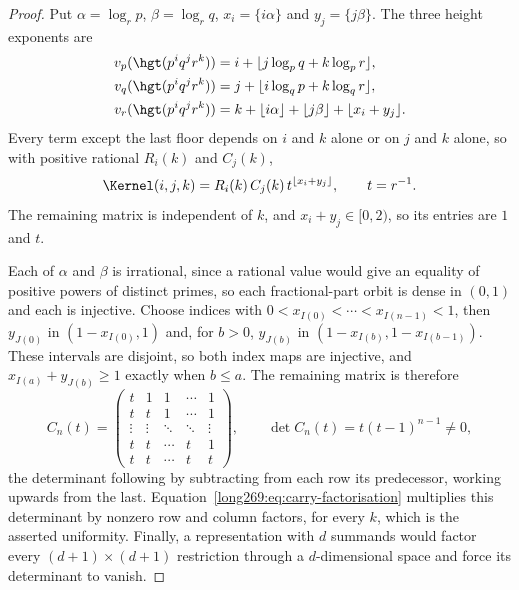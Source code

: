 \begin{proof}
Put $\alpha=\log_r p$, $\beta=\log_r q$, $x_i=\{i\alpha\}$ and
$y_j=\{j\beta\}$.  The three height exponents are
\[
 \begin{split}
 v_p(\hgt(p^iq^jr^k))&=i+\lfloor j\log_pq+k\log_pr\rfloor,\\
 v_q(\hgt(p^iq^jr^k))&=j+\lfloor i\log_qp+k\log_qr\rfloor,\\
 v_r(\hgt(p^iq^jr^k))&=k+\lfloor i\alpha\rfloor+\lfloor j\beta\rfloor+
   \lfloor x_i+y_j\rfloor .
 \end{split}
\]
Every term except the last floor depends on $i$ and $k$ alone or on $j$ and $k$
alone, so with positive rational $R_i(k)$ and $C_j(k)$,
\begin{equation}\label{long269:eq:carry-factorisation}
 \Kernel(i,j,k)=R_i(k)\,C_j(k)\,t^{\lfloor x_i+y_j\rfloor},
 \qquad t=r^{-1} .
\end{equation}
The remaining matrix is independent of $k$, and $x_i+y_j\in[0,2)$, so its
entries are $1$ and $t$.

Each of $\alpha$ and $\beta$ is irrational, since a rational value would give
an equality of positive powers of distinct primes, so each fractional-part
orbit is dense in $(0,1)$ and each is injective.  Choose indices with
$0<x_{I(0)}<\cdots<x_{I(n-1)}<1$, then $y_{J(0)}$ in $(1-x_{I(0)},1)$ and, for
$b>0$, $y_{J(b)}$ in $(1-x_{I(b)},1-x_{I(b-1)})$.  These intervals are
disjoint, so both index maps are injective, and $x_{I(a)}+y_{J(b)}\ge1$ exactly
when $b\le a$.  The remaining matrix is therefore
\[
 C_n(t)=\begin{pmatrix}
 t&1&1&\cdots&1\\
 t&t&1&\cdots&1\\
 \vdots&\vdots&\ddots&\ddots&\vdots\\
 t&t&\cdots&t&1\\
 t&t&\cdots&t&t
 \end{pmatrix},
 \qquad
 \det C_n(t)=t(t-1)^{n-1}\ne0 ,
\]
the determinant following by subtracting from each row its predecessor, working
upwards from the last.  Equation~\eqref{long269:eq:carry-factorisation} multiplies this
determinant by nonzero row and column factors, for every $k$, which is the
asserted uniformity.  Finally, a representation with $d$ summands would factor
every $(d+1)\times(d+1)$ restriction through a $d$-dimensional space and force
its determinant to vanish.
\end{proof}

